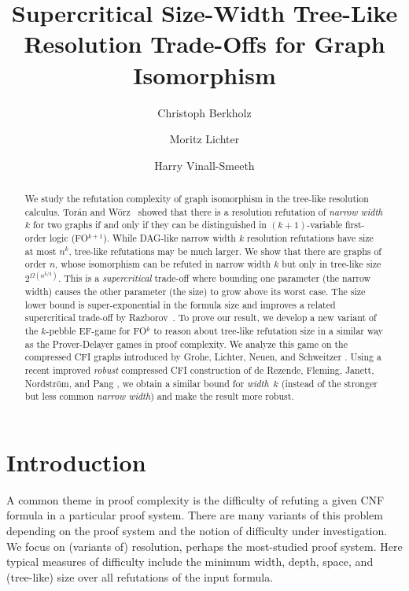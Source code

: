 \documentclass[a4paper,english, thm-restate]{lipics-v2021}
\title{Supercritical Size-Width Tree-Like Resolution Trade-Offs for Graph Isomorphism}
\author{Christoph Berkholz}{Technische Universit\"at Ilmenau, Germany}{christoph.berkholz@tu-ilmenau.de}{https://orcid.org/0000-0002-3554-517X}{}
\author{Moritz Lichter}{RWTH Aachen University, Germany}{lichter@lics.rwth-aachen.de}{https://orcid.org/0000-0001-5437-8074}{
Funded by the European Union (ERC, SymSim, 101054974). Views and opinions
expressed are those of the author(s) and do not necessarily reflect those of the European
Union or~the ERC. Neither the European Union nor the granting authority
can be held responsible for~them.
%
%
%
%
}
\author{Harry Vinall-Smeeth}{Technische Universit\"at Ilmenau, Germany}{harry.vinall-smeeth@tu-ilmenau.de}{https://orcid.org/0000-0003-2422-9435}{}
\newcommand{\confORfull}[2]{#1}
\begin{document}
        
        \maketitle
        
%


\begin{abstract}
We study the refutation complexity of graph isomorphism in the
tree-like resolution calculus.
Torán and Wörz~\cite{DBLP:journals/tocl/ToranW23} showed that 
there is a resolution refutation of \emph{narrow width} $k$ for two graphs if and only if
they can be distinguished in $(k+1)$-variable first-order logic (FO$^{k+1}$)\confORfull{}{ and
hence by a count-free variant of the $k$-dimensional
Weisfeiler-Leman algorithm}.
While DAG-like narrow width $k$ resolution refutations have size at most $n^k$, tree-like refutations
may be much larger.
We show that there are
graphs of order $n$, whose isomorphism can be refuted in narrow width $k$ 
but only in tree-like size $2^{\Omega(n^{k/2})}$.
%
This is a \emph{supercritical} trade-off where bounding one
parameter (the narrow width) causes the other parameter (the size) to
grow above its worst case. The size lower bound is super-exponential
in the formula size and improves a related supercritical\confORfull{}{ width versus tree-like size} trade-off by Razborov~\cite{DBLP:journals/jacm/Razborov16}.\confORfull{}{\\}
To prove our result, we develop a new variant of the $k$-pebble
EF-game for FO$^k$ to reason about tree-like refutation
size in a similar way as the Prover-Delayer games in proof
complexity. We analyze this game on the compressed CFI graphs introduced by Grohe, Lichter,
Neuen, and Schweitzer \cite{DBLP:conf/focs/GroheLNS23}.
Using a recent improved
\emph{robust} compressed CFI construction of de Rezende, Fleming, Janett, Nordström, and Pang \cite{RFJN024},
we obtain a similar bound for \emph{width}~$k$ (instead of the
stronger but less common \emph{narrow width}) and make the
result more robust.
\end{abstract}         
        
        \section{Introduction}\label{sec:introduction}
        
        
%


A common theme in proof complexity is the difficulty of refuting a given CNF formula in a particular proof system.
There are many variants of this problem depending on the proof system and the notion of difficulty under investigation. We focus on (variants of) resolution,  perhaps the most-studied proof system. Here typical measures of difficulty include the minimum width, depth, space, and (tree-like) size over all refutations of the input formula. 
\end{document}
